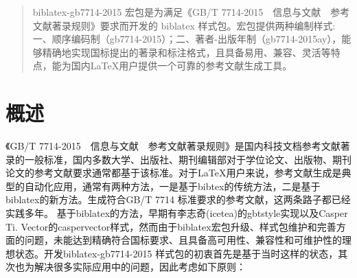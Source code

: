 \documentclass[11pt]{article} %
\begin{document}



\pagestyle{plain}



\dateformanual{\today}

\titleandauthor

\begin{quotation}
biblatex-gb7714-2015 宏包是为满足《GB/T 7714-2015~~信息与文献~~参考文献著录规则》要求而开发的 biblatex 样式包。宏包提供两种编制样式: 一、顺序编码制（gb7714-2015）；二、著者-出版年制（gb7714-2015ay），能够精确地实现国标提出的著录和标注格式，且具备易用、兼容、灵活等特点，能为国内\LaTeX{}用户提供一个可靠的参考文献生成工具。
\end{quotation}
\tableofcontents

\listoffigures
\listoftables
\listofegcode
\newlength{\textparwd}

\newpage
{}
\pagestyle{fancy}
\section{概述}

《GB/T 7714-2015~~信息与文献~~参考文献著录规则》是国内科技文档参考文献著录的一般标准，国内多数大学、出版社、期刊编辑部对于学位论文、出版物、期刊论文的参考文献要求通常都基于该标准。对于\LaTeX{}用户来说，参考文献生成是典型的自动化应用，通常有两种方法，一是基于bibtex的传统方法，二是基于biblatex的新方法。生成符合GB/T 7714 标准要求的参考文献，这两条路子都已经实践多年。
基于biblatex的方法，早期有李志奇(icetea)的gbtstyle实现以及Casper Ti. Vector的caspervector样式，然而由于biblatex宏包升级、样式包维护和完善方面的问题，未能达到精确符合国标要求、且具备高可用性、兼容性和可维护性的理想状态。开发biblatex-gb7714-2015 样式包的初衷首先是基于当时这样的状态，其次也为解决很多实际应用中的问题，因此考虑如下原则：
\end{document}
